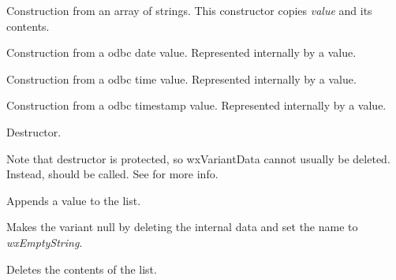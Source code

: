 Construction from an array of strings.  This constructor copies {\it value} and its contents.


Construction from a odbc date value.  Represented internally by a  value.


Construction from a odbc time value.  Represented internally by a  value.


Construction from a odbc timestamp value.  Represented internally by a  value.

\label{wxvariantdtor}


Destructor.

Note that destructor is protected, so wxVariantData cannot usually
be deleted. Instead,  should be called.
See  for more info.


\label{wxvariantappend}


Appends a value to the list.

\label{wxvariantclear}


Makes the variant null by deleting the internal data and
set the name to {\it wxEmptyString}.

\label{wxvariantclearlist}


Deletes the contents of the list.


\label{wxvariantconvert}




